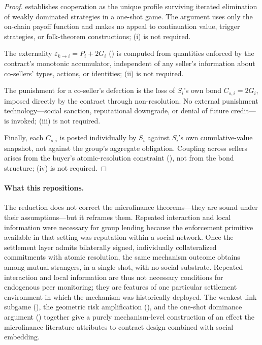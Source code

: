 \documentclass[11pt,a4paper]{article}
\theoremstyle{definition}
\theoremstyle{remark}
\newcommand{\pay}{P}           %
\newcommand{\cumval}{G}        %
\begin{document}
\begin{proof}
 establishes cooperation as the unique profile
surviving iterated elimination of weakly dominated strategies in a
one-shot game. The argument uses only the on-chain payoff function and
makes no appeal to continuation value, trigger strategies, or
folk-theorem constructions; (i) is not required.

The externality $\varepsilon_{k \to i} = \pay_i + 2\cumval_i$
() is computed from quantities
enforced by the contract's monotonic accumulator, independent of any
seller's information about co-sellers' types, actions, or identities;
(ii) is not required.

The punishment for a co-seller's defection is the loss of $S_i$'s own
bond $C_{s,i} = 2\cumval_i$, imposed directly by the contract through
non-resolution. No external punishment technology---social sanction,
reputational downgrade, or denial of future credit---is invoked;
(iii) is not required.

Finally, each $C_{s,i}$ is posted individually by $S_i$ against
$S_i$'s own cumulative-value snapshot, not against the group's
aggregate obligation. Coupling across sellers arises from the buyer's
atomic-resolution constraint (), not from
the bond structure; (iv) is not required.
\end{proof}

\paragraph{What this repositions.}
The reduction does not correct the microfinance theorems---they are
sound under their assumptions---but it reframes them. Repeated
interaction and local information were necessary for group lending
because the enforcement primitive available in that setting was
reputation within a social network. Once the settlement layer admits
bilaterally signed, individually collateralized commitments with
atomic resolution, the same mechanism outcome obtains among mutual
strangers, in a single shot, with no social substrate. Repeated
interaction and local information are thus not necessary conditions
for endogenous peer monitoring; they are features of one particular
settlement environment in which the mechanism was historically
deployed. The weakest-link subgame (),
the geometric risk amplification (), and
the one-shot dominance argument () together
give a purely mechanism-level construction of an effect the
microfinance literature attributes to contract design combined with
social embedding.
\end{document}
